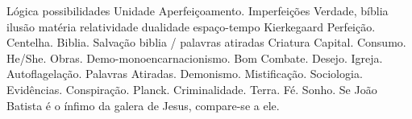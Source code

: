 \documentclass[12pt,a4paper]{article}
\begin{document}
\begin{thebibliography}{15}
		 L\'ogica
		 possibilidades
		 Unidade
		 Aperfei\c{c}oamento. Imperfei\c{c}\~oes
		 Verdade, b\'iblia
		 ilus\~ao
		 mat\'eria
		 relatividade
		 dualidade
		 espa\c{c}o-tempo
		 Kierkegaard
		 Perfei\c{c}\~ao. Centelha. Biblia.
		 Salva\c{c}\~ao
		 biblia / palavras atiradas
		 Criatura
		 Capital. Consumo.
		 He/She.
		 Obras.
		 Demo-monoencarnacionismo.
		 Bom Combate.
		 Desejo.
             Igreja.
		 Autoflagela\c{c}\~ao.
		 Palavras Atiradas.
		 Demonismo.
		 Mistifica\c{c}\~ao.
		 Sociologia.
		 Evid\^encias.
		 Conspira\c{c}\~ao.
		 Planck.
		 Criminalidade.
		 Terra.
		 F\'e.
		 Sonho.
		 Se Jo\~ao Batista \'e o \'infimo da galera de Jesus, compare-se a ele.
	\end{thebibliography}

	\addtocontents{}{\noindent\protect\rule{\textwidth}{.2pt}\par}
\end{document}
